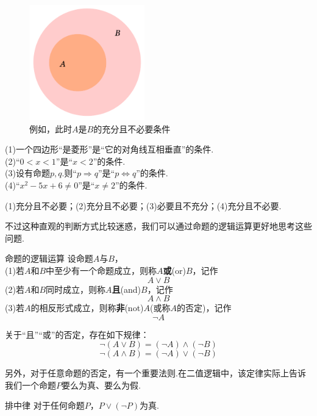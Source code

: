 \documentclass[lang=cn, zihao=5]{elegantbook}
\newcommand{\tk}{\uline{\hspace{4em}}}
\begin{document}
\begin{figure}[h!]
	\centering
	\includegraphics[width=5cm]{attachment/202302191.pdf}
	\caption{例如，此时$A$是$B$的充分且不必要条件}
\end{figure}

\begin{example}
	(1)一个四边形“是菱形”是“它的对角线互相垂直”的\tk 条件. \\
	(2)“$0<x<1$”是“$x<2$”的\tk 条件. \\
	(3)设有命题$p,q$.则“$p \Rightarrow q$”是“$p \Leftrightarrow q$”的\tk 条件. \\
	(4)“$x^2-5x+6 \neq 0$”是“$x \neq 2$”的\tk 条件.
\end{example}
\begin{solution}
	(1)充分且不必要；(2)充分且不必要；(3)必要且不充分；(4)充分且不必要.
\end{solution}

不过这种直观的判断方式比较迷惑，我们可以通过命题的逻辑运算更好地思考这些问题.

\begin{definition}{命题的逻辑运算} %
	设命题$A$与$B$， \\
	(1)若$A$和$B$中至少有一个命题成立，则称$A$\textbf{或}(or)$B$，记作$$A \vee B$$
	(2)若$A$和$B$同时成立，则称$A$\textbf{且}(and)$B$，记作$$A \wedge B$$
	(3)若$A$的相反形式成立，则称\textbf{非}(not)$A$(或称$A$的否定)，记作$$\neg A$$
\end{definition}
\begin{remark}
	关于“且”“或”的否定，存在如下规律：
	$$\neg (A \vee B) = (\neg A) \wedge (\neg B)$$
	$$\neg (A \wedge B) = (\neg A) \vee (\neg B)$$
\end{remark}

另外，对于任意命题的否定，有一个重要法则.在二值逻辑中，该定律实际上告诉我们一个命题$P$要么为真、要么为假.

\begin{proposition}{排中律}
	对于任何命题$P$，$P \vee (\neg P)$为真.
\end{proposition}
\end{document}
